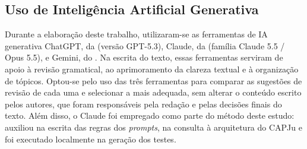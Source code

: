 \subsection{Uso de Inteligência Artificial Generativa}

Durante a elaboração deste trabalho, utilizaram-se as ferramentas de IA generativa ChatGPT, da  (versão GPT-5.3), Claude, da  (família Claude 5.5 / Opus 5.5), e Gemini, do . Na escrita do texto, essas ferramentas serviram de apoio à revisão gramatical, ao aprimoramento da clareza textual e à organização de tópicos. Optou-se pelo uso das três ferramentas para comparar as sugestões de revisão de cada uma e selecionar a mais adequada, sem alterar o conteúdo escrito pelos autores, que foram responsáveis pela redação e pelas decisões finais do texto. Além disso, o Claude foi empregado como parte do método deste estudo: auxiliou na escrita das regras dos \textit{prompts}, na consulta à arquitetura do CAPJu e foi executado localmente na geração dos testes.

